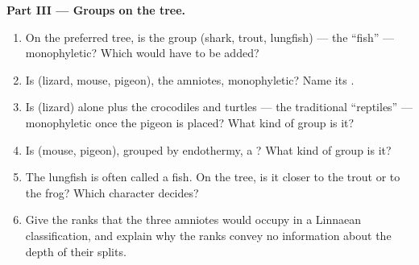 \begin{problem}
\medskip
\noindent\textbf{Part III --- Groups on the tree.}
\begin{enumerate}[resume]
  \item On the preferred tree, is the group (shark, trout, lungfish)
        --- the ``fish'' --- monophyletic? Which  would have to be
        added?
  \item Is (lizard, mouse, pigeon), the amniotes, monophyletic? Name
        its .
  \item Is (lizard) alone plus the crocodiles and turtles --- the
        traditional ``reptiles'' --- monophyletic once the pigeon is
        placed? What kind of group is it?
  \item Is (mouse, pigeon), grouped by endothermy, a ? What kind
        of group is it?
  \item The lungfish is often called a fish. On the tree, is it closer
        to the trout or to the frog? Which character decides?
  \item Give the ranks that the three amniotes would occupy in a
        Linnaean classification, and explain why the ranks convey no
        information about the depth of their splits.
\end{enumerate}


\end{problem}
